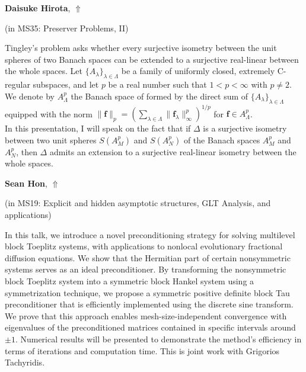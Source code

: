 \documentclass[ILAS2025-program.tex]{subfiles}
\begin{document}
\hypertarget{down0248}{}\begin{ilasabstract}
    
\textbf{Daisuke Hirota},  \hfill \hyperlink{up0248}{$\Uparrow$}
    
    
(in {\color{mstitle}MS35: Preserver Problems, II})
        
\mtskip
    Tingley's problem asks whether every surjective isometry between the unit spheres of two Banach spaces can be 
extended to a surjective real-linear  between the whole spaces. 
Let $\{A_{\lambda}\}_{\lambda\in\Lambda}$ be a family of uniformly closed, extremely C-regular subspaces,  
and 
let $p$ be a real number such that $1<p<\infty$ with $p\neq 2$. 
We denote by $A_{\Lambda}^{p}$ the Banach space of formed by the direct sum of $\{A_{\lambda}\}_{\lambda\in \Lambda}$ 
equipped with the norm $\|{\bm{f}}\|_{p}=\left(\sum_{\lambda\in \Lambda}\|{\bm{f}}_{\lambda}\|_{\infty}^{p}\right)^{1/p}$ for ${\bm{f}}\in A_{\Lambda}^{p}$. \\
\quad In this presentation, I will speak on the fact that
 if $\Delta$ is a surjective isometry between two unit spheres $S(A_{M}^{p})$ and $S(A_{N}^{p})$ of the Banach spaces 
 $A_{M}^{p}$ and $A_{N}^{p}$, 
 then $\Delta$ admits an extension to a surjective real-linear isometry between the whole spaces.
\end{ilasabstract}
    

\hypertarget{down0174}{}\begin{ilasabstract}
    
\textbf{Sean Hon},  \hfill \hyperlink{up0174}{$\Uparrow$}
    
    
(in {\color{mstitle}MS19: Explicit and hidden asymptotic structures, GLT Analysis, and applications})
        
\mtskip
    In this talk, we introduce a novel preconditioning strategy for solving multilevel block Toeplitz systems, with applications to nonlocal evolutionary fractional diffusion equations. We show that the Hermitian part of certain nonsymmetric systems serves as an ideal preconditioner. By transforming the nonsymmetric block Toeplitz system into a symmetric block Hankel system using a symmetrization technique, we propose a symmetric positive definite block Tau preconditioner that is efficiently implemented using the discrete sine transform. We prove that this approach enables mesh-size-independent convergence with eigenvalues of the preconditioned matrices contained in specific intervals around $\pm 1$. Numerical results will be presented to demonstrate the method's efficiency in terms of iterations and computation time. This is joint work with Grigorios Tachyridis.
\end{ilasabstract}
    
\end{document}

